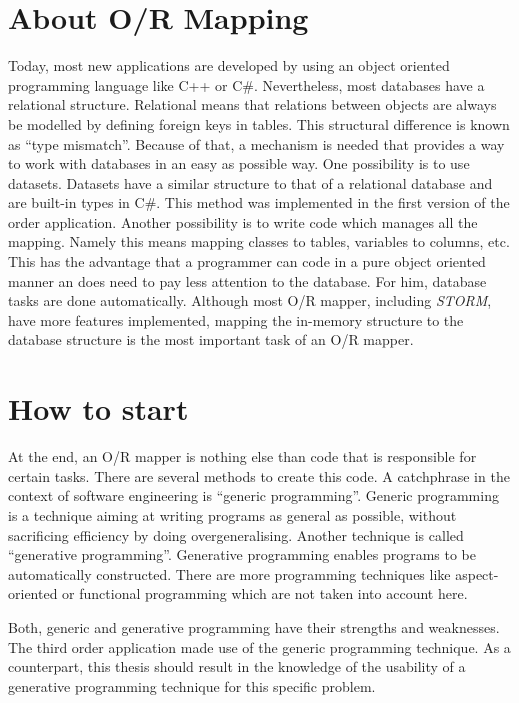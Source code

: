 	\section{About O/R Mapping}
		Today, most new applications are developed by using an object oriented programming
		language like C++ or C\#. Nevertheless, most databases have a relational structure.
		Relational means that relations between objects are always be modelled by defining foreign
		keys in tables. This structural difference is known as ``type mismatch''. Because of that, a mechanism
		is needed that provides a way to work with databases in an easy as possible way. One
		possibility is to use datasets. Datasets have a similar structure to that of a relational 
		database and are built-in types in C\#.
		This method was implemented in the first version of the order application.
		Another possibility is to write code which manages all the mapping. Namely this means
		mapping classes to tables, variables to columns, etc. This has the advantage that
		a programmer can code in a pure object oriented manner an does need to pay less
		attention to the database. For him, database tasks are done automatically. Although most
		O/R mapper, including \textit{STORM}, have more features implemented, mapping the in-memory
		structure to the database structure is the most important task of an O/R mapper.
	
	\section{How to start}
		At the end, an O/R mapper is nothing else than code that is responsible for
		certain tasks. There are several methods to create this code. A catchphrase in 
		the context of software engineering is ``generic programming''. Generic programming is 
		a technique aiming at writing programs as general as possible, 
		without sacrificing efficiency by doing overgeneralising. Another technique is called
		``generative programming''. Generative programming enables programs to be automatically
		constructed. There are more programming techniques like aspect-oriented or functional
		programming which are not taken into account here.
		
		Both, generic and generative programming have their strengths and weaknesses.
		The third order application made use of the generic programming technique. As
		a counterpart, this thesis should result in the knowledge of the usability
		of a generative programming technique for this specific problem.
		
